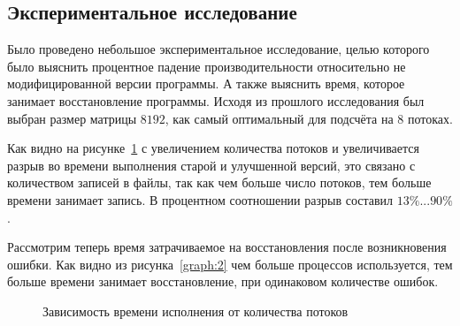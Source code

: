 \documentclass[a4peper, 12pt, titlepage, finall]{extreport}
\begin{document}
        \subsection{Экспериментальное исследование}
            Было проведено небольшое экспериментальное исследование, целью которого было выяснить процентное падение производительности относительно не модифицированной версии программы.
            А также выяснить время, которое занимает восстановление программы. Исходя из прошлого исследования был выбран размер матрицы \(8192\),
            как самый оптимальный для подсчёта на 8 потоках.

            Как видно на рисунке~\ref{graph:1} с увеличением количества потоков и увеличивается разрыв во времени выполнения старой и улучшенной версий, это связано с количеством записей в файлы,
            так как чем больше число потоков, тем больше времени занимает запись. В процентном соотношении разрыв составил \(13\% ... 90\%\).
            
            Рассмотрим теперь время затрачиваемое на восстановления после возникновения ошибки. Как видно из рисунка~\ref{graph:2} чем больше процессов используется, тем больше времени занимает восстановление, при одинаковом количестве ошибок.

            \begin{figure}[!htbp]
                \centering
                \captionsetup{justification=centering}
                \caption{Зависимость времени исполнения от количества потоков}
                \label{graph:1}
            \end{figure}
            
\end{document}
